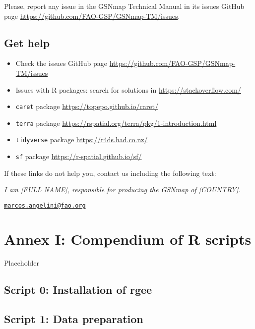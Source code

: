 \documentclass[
  10pt,
  b5paper,
  oneside]{book}
\providecommand{\tightlist}{%
  \setlength{\itemsep}{0pt}\setlength{\parskip}{0pt}}
\begin{document}
Please, report any issue in the GSNmap Technical Manual in its issues GitHub page \url{https://github.com/FAO-GSP/GSNmap-TM/issues}.

\hypertarget{get-help}{%
\section{Get help}\label{get-help}}

\begin{itemize}
\tightlist
\item
  Check the issues GitHub page \url{https://github.com/FAO-GSP/GSNmap-TM/issues}
\item
  Issues with R packages: search for solutions in \url{https://stackoverflow.com/}
\item
  \texttt{caret} package \url{https://topepo.github.io/caret/}
\item
  \texttt{terra} package \url{https://rspatial.org/terra/pkg/1-introduction.html}
\item
  \texttt{tidyverse} package \url{https://r4ds.had.co.nz/}
\item
  \texttt{sf} package \url{https://r-spatial.github.io/sf/}
\end{itemize}

If these links do not help you, contact us including the following text:

\emph{I am {[}FULL NAME{]}, responsible for producing the GSNmap of {[}COUNTRY{]}.}

\href{mailto:marcos.angelini@fao.org}{\nolinkurl{marcos.angelini@fao.org}}

\hypertarget{annex-i-compendium-of-r-scripts}{%
\chapter*{Annex I: Compendium of R scripts}\label{annex-i-compendium-of-r-scripts}}

Placeholder

\hypertarget{script-0-installation-of-rgee}{%
\section*{Script 0: Installation of rgee}\label{script-0-installation-of-rgee}}

\hypertarget{script-1-data-preparation}{%
\section*{Script 1: Data preparation}\label{script-1-data-preparation}}
\end{document}
